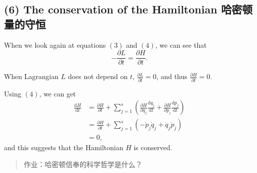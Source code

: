 \subsection*{(6) The conservation of the Hamiltonian
哈密顿量的守恒}\label{the-conservation-of-the-hamiltonian-ux54c8ux5bc6ux987fux91cfux7684ux5b88ux6052}

When we look again at equations \((3)\) and \((4)\), we can see that
\[- \frac{\partial L}{\partial t} = \frac{\partial H}{\partial t}.\]

When Lagrangian \(L\) does not depend on \(t\),
\(\displaystyle \frac{\partial L}{\partial t} = 0\), and thus
\(\displaystyle \frac{\partial H}{\partial t} = 0\).

Using \((4)\), we can get \begin{align*}
    \frac{\mathrm{d}H}{\mathrm{d}t} & = \frac{\partial H}{\partial t} + \sum_{j = 1}^{s} \left( \frac{\partial H}{\partial q_j} \frac{\mathrm{d}q_j}{\mathrm{d}t} + \frac{\partial H}{\partial p_j} \frac{\mathrm{d} p_j}{\mathrm{d}t} \right) \\
    & = \frac{\partial H}{\partial t} + \sum_{j = 1}^{s} \left( - \dot{p}_j \dot{q}_j + \dot{q}_j \dot{p}_j \right) \\
    & = 0,
\end{align*} and this suggests that the Hamiltonian \(H\) is
conserved.

\begin{quote}
作业：哈密顿信奉的科学哲学是什么？
\end{quote}
